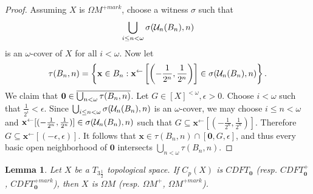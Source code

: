 \documentclass{amsart}
\renewcommand{\vec}{\mathbf}
\theoremstyle{plain}
\newtheorem{lemma}[theorem]{Lemma}
\theoremstyle{definition}
\theoremstyle{remark}
\theoremstyle{plain}
\theoremstyle{definition}
\theoremstyle{remark}
\begin{document}
\begin{proof}
  Assuming \(X\) is \(\Omega M^{+mark}\), choose a witness
  \(\sigma\) such that
  \[
    \bigcup_{i\leq n<\omega} \sigma(\mathcal{U}_n(B_n),n)
  \]
  is an \(\omega\)-cover of \(X\) for all \(i<\omega\).
  Now let
  \[
    \tau(B_n,n)
      =
    \left\{
      \vec x\in B_n
    :
      \vec x^{\leftarrow}\left[\left(-\frac{1}{2^n},\frac{1}{2^n}\right)\right]
        \in
      \sigma(\mc U_n(B_n),n)
    \right\}
  .\]
  We claim that \(\vec 0\in\cl{\bigcup_{n<\omega}\tau(B_n,n)}\).
  Let \(G\in[X]^{<\omega},\epsilon>0\). Choose \(i<\omega\) such that
  \(\frac{1}{2^i}<\epsilon\). Since
  \(\bigcup_{i\leq n<\omega} \sigma(\mathcal{U}_n(B_n),n)\) is an \(\omega\)-cover,
  we may choose \(i\leq n<\omega\) and
  \(\vec x^{\leftarrow}[(-\frac{1}{2^n},\frac{1}{2^n})]\in\sigma(\mc U_n(B_n),n)\)
  such that \(G\subseteq \vec x^{\leftarrow}[(-\frac{1}{2^n},\frac{1}{2^n})]\).
  Therefore \(G\subseteq \vec x^{\leftarrow}[(-\epsilon,\epsilon)]\).
  It follows that \(\vec x\in \tau(B_n,n)\cap[\vec 0,G,\epsilon]\), and thus
  every basic open neighborhood of \(\vec 0\) intersects
  \(\bigcup_{n<\omega}\tau(B_n,n)\).
\end{proof}

\begin{lemma}\label{mengerFanLemma2}
  Let \(X\) be a \(T_{3\frac{1}{2}}\) topological space.
  If \(C_p(X)\) is \(CDFT_{\vec 0}\)
  (resp. \(CDFT_{\vec 0}^+\), \(CDFT_{\vec 0}^{+mark}\)),
  then \(X\) is \(\Omega M\)
  (resp. \(\Omega M^+\), \(\Omega M^{+mark}\)).
\end{lemma}
\end{document}

